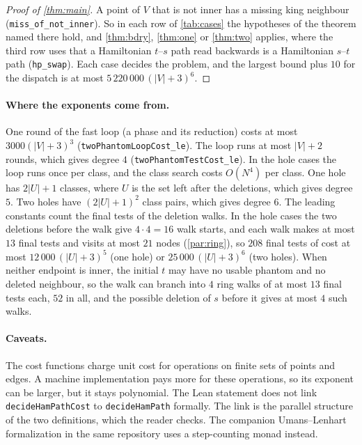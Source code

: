 \documentclass[11pt]{article}
\theoremstyle{plain}
\theoremstyle{definition}
\theoremstyle{remark}
\newcommand{\lean}[1]{\texttt{#1}}
\begin{document}
\begin{proof}[Proof of \cref{thm:main}]
A point of $V$ that is not inner has a missing king neighbour (\lean{miss\_of\_not\_inner}).
So in each row of \cref{tab:cases} the hypotheses of the theorem named there hold, and
\cref{thm:bdry}, \cref{thm:one} or \cref{thm:two} applies, where the third row uses that a Hamiltonian $t$--$s$
path read backwards is a Hamiltonian $s$--$t$ path (\lean{hp\_swap}).
Each case decides the problem, and the largest bound plus $10$ for the dispatch is at most
$5\,220\,000\,(|V|+3)^6$.
\end{proof}

\paragraph{Where the exponents come from.}
One round of the fast loop (a phase and its reduction) costs at most $3000(|V|+3)^3$
(\lean{twoPhantomLoopCost\_le}).
The loop runs at most $|V|+2$ rounds, which gives degree $4$ (\lean{twoPhantomTestCost\_le}).
In the hole cases the loop runs once per class, and the class search costs $O(N^4)$ per class.
One hole has $2|U|+1$ classes, where $U$ is the set left after the deletions, which gives degree
$5$.
Two holes have $(2|U|+1)^2$ class pairs, which gives degree $6$.
The leading constants count the final tests of the deletion walks.
In the hole cases the two deletions before the walk give $4\cdot4=16$ walk starts, and each walk
makes at most $13$ final tests and visits at most $21$ nodes (\cref{par:ring}), so $208$ final tests
of cost at most $12\,000\,(|U|+3)^5$ (one hole) or $25\,000\,(|U|+3)^6$ (two holes).
When neither endpoint is inner, the initial $t$ may have no usable phantom and no deleted neighbour,
so the walk can branch into $4$ ring walks of at most $13$ final tests each, $52$ in all, and the
possible deletion of $s$ before it gives at most $4$ such walks.

\paragraph{Caveats.}
The cost functions charge unit cost for operations on finite sets of points and edges.
A machine implementation pays more for these operations, so its exponent can be larger, but it
stays polynomial.
The Lean statement does not link \lean{decideHamPathCost} to \lean{decideHamPath} formally.
The link is the parallel structure of the two definitions, which the reader checks.
The companion Umans--Lenhart formalization in the same repository uses a step-counting monad instead.
\end{document}
